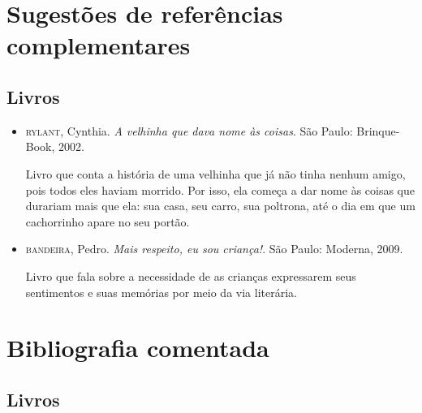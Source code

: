 \documentclass[11pt]{extarticle}
\begin{document}
\section{Sugestões de referências complementares}

\subsection{Livros} 

\begin{itemize}
\item \textsc{rylant}, Cynthia. \textit{A velhinha que dava nome às coisas}. São Paulo: Brinque-Book, 2002.

Livro que conta a história de uma velhinha que já não tinha nenhum amigo, pois todos eles haviam morrido. Por isso, ela começa a dar nome às coisas que durariam mais que ela: sua casa, seu carro, sua poltrona, até o dia em que um cachorrinho apare no seu portão.

\item \textsc{bandeira}, Pedro. \textit{Mais respeito, eu sou criança!}. São Paulo: Moderna, 2009.

Livro que fala sobre a necessidade de as crianças expressarem seus sentimentos e suas memórias por meio da via literária.

\end{itemize}

\section{Bibliografia comentada}
\subsection{Livros}
\end{document}
